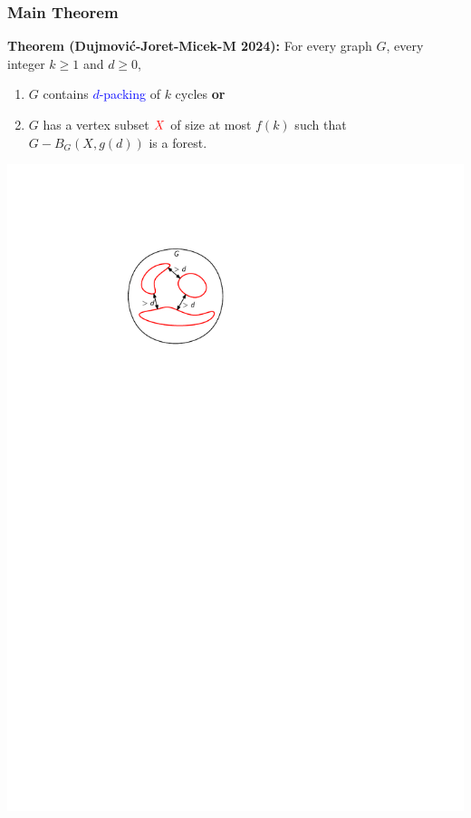 \documentclass{beamer}
\begin{document}
\begin{frame}
  \frametitle{Main Theorem}

  \noindent\textbf{Theorem (Dujmović-Joret-Micek-M 2024):} For every graph $G$, every integer $k\ge 1$ and $d\ge 0$,
  \begin{enumerate}%
    \item $G$ contains \textcolor{blue}{$d$-packing} of $k$ cycles \textbf{or}
    \item $G$ has a vertex subset $\mathcolor{red}{X}$ of size at most $f(k)$ such that $G-B_G(X,g(d))$ is a forest.  \newline {}
  \end{enumerate}

  \begin{center}
    \includegraphics[scale=.9,page=1]{figs/cep}

\end{center}
\end{frame}
\end{document}
